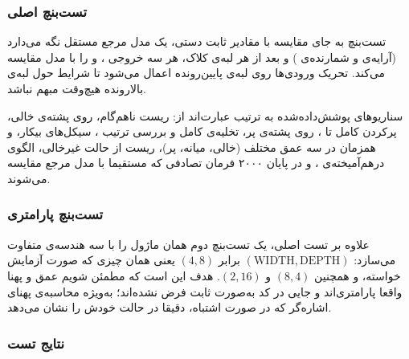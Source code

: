 \documentclass[10pt,a4paper]{article}
\begin{document}
\pagebreak

\subsubsection*{تست‌بنچ اصلی}

تست‌بنچ به جای مقایسه با مقادیر ثابت دستی، یک {مدل مرجع} مستقل نگه می‌دارد (آرایه‌ی  و شمارنده‌ی ) و بعد از هر لبه‌ی کلاک، هر سه خروجی ،  و  را با مدل مقایسه می‌کند. تحریک ورودی‌ها روی لبه‌ی پایین‌رونده اعمال می‌شود تا شرایط  حول لبه‌ی بالارونده هیچ‌وقت مبهم نباشد.

سناریوهای پوشش‌داده‌شده به ترتیب عبارت‌اند از: ریست ناهم‌گام،  روی پشته‌ی خالی، پرکردن کامل تا ،  روی پشته‌ی پر، تخلیه‌ی کامل و بررسی ترتیب ، سیکل‌های بیکار،  و  همزمان در سه عمق مختلف (خالی، میانه، پر)، ریست از حالت غیرخالی، الگوی درهم‌آمیخته‌ی ، و در پایان ۲۰۰۰ فرمان {تصادفی} که مستقیما با مدل مرجع مقایسه می‌شوند.

\begin{latin}

\end{latin}

\pagebreak

\subsubsection*{تست‌بنچ پارامتری}

علاوه بر تست اصلی، یک تست‌بنچ دوم همان ماژول را با سه هندسه‌ی متفاوت می‌سازد: $(\mathrm{WIDTH},\mathrm{DEPTH})$ برابر $(4,8)$ یعنی همان چیزی که صورت آزمایش خواسته، و همچنین $(8,4)$ و $(2,16)$. هدف این است که مطمئن شویم عمق و پهنا واقعا پارامتری‌اند و جایی در کد به‌صورت ثابت فرض نشده‌اند؛ به‌ویژه محاسبه‌ی پهنای اشاره‌گر که در صورت اشتباه، دقیقا در حالت  خودش را نشان می‌دهد.

\begin{latin}

\end{latin}

\subsubsection*{نتایج تست}


\begin{latin}

\end{latin}
\end{document}
